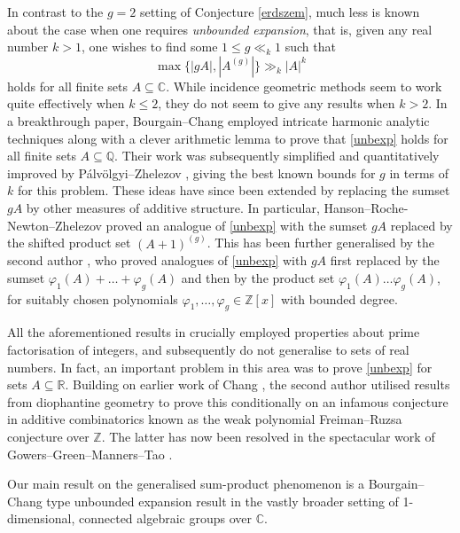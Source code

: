 \documentclass[12pt, reqno]{amsart}
\theoremstyle{remark}
\theoremstyle{definition}
\numberwithin{equation}{section}
\begin{document}
In contrast to the $g=2$ setting of Conjecture \ref{erdszem}, much less is known about the case when one requires \emph{unbounded expansion}, that is, given any real number $k >1$, one wishes to find some $1 \leq g \ll_k 1$ such that
\begin{equation} \label{unbexp}
\max\{ |gA|, |A^{(g)}| \} \gg_k |A|^k 
\end{equation}
holds for all finite sets $A \subseteq \mathbb{C}$. While incidence geometric methods seem to work quite effectively when $k \leq 2$, they do not seem to give any results when $k > 2$. In a breakthrough paper, Bourgain--Chang \cite{BC2004} employed intricate harmonic analytic techniques along with a clever arithmetic lemma to prove that \eqref{unbexp} holds for all finite sets $A \subseteq \mathbb{Q}$. Their work was subsequently simplified and quantitatively improved by P\'{a}lv\"{o}lgyi--Zhelezov \cite{PZ2021}, giving the best known bounds for $g$ in terms of $k$ for this problem. These ideas have since been extended by replacing the sumset $gA$ by other measures of additive structure. In particular, Hanson--Roche-Newton--Zhelezov \cite{HRNZ2020} proved an analogue of \eqref{unbexp} with the sumset $gA$ replaced by the shifted product set $(A+1)^{(g)}$. This has been further generalised by the second author \cite{Mu2024b}, who proved analogues of \eqref{unbexp} with $gA$ first replaced by the sumset $\varphi_1(A) + \dots + \varphi_g(A)$ and then by the product set $\varphi_1(A) \dots \varphi_g(A)$, for suitably chosen polynomials $\varphi_1, \dots, \varphi_g \in \mathbb{Z}[x]$ with bounded degree. 

All the aforementioned results in \cite{BC2004, PZ2021, HRNZ2020, Mu2024b} crucially employed properties about prime factorisation of integers, and subsequently do not generalise to sets of real numbers. In fact, an important problem in this area was to prove \eqref{unbexp} for sets $A \subseteq \mathbb{R}$.  Building on earlier work of Chang \cite{Ch2009}, the second author \cite{Mu2024a} utilised results from diophantine geometry to prove this conditionally on an infamous conjecture in additive combinatorics known as the weak polynomial Freiman--Ruzsa conjecture over $\mathbb{Z}$. The latter has now been resolved in the spectacular work of Gowers--Green--Manners--Tao \cite{GGMT2025}.  


Our main result on the generalised sum-product phenomenon is a Bourgain--Chang type unbounded expansion result in the vastly broader setting of 1-dimensional, connected algebraic groups over $\mathbb{C}$. 
\end{document}
